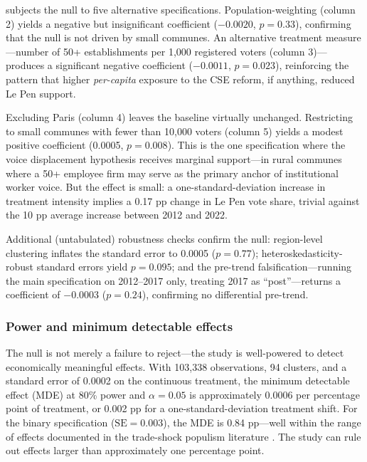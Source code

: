 \documentclass[12pt]{article}
\begin{document}
 subjects the null to five alternative specifications. Population-weighting (column 2) yields a negative but insignificant coefficient ($-0.0020$, $p = 0.33$), confirming that the null is not driven by small communes. An alternative treatment measure---number of 50+ establishments per 1,000 registered voters (column 3)---produces a significant negative coefficient ($-0.0011$, $p = 0.023$), reinforcing the pattern that higher \textit{per-capita} exposure to the CSE reform, if anything, reduced Le Pen support.



Excluding Paris (column 4) leaves the baseline virtually unchanged. Restricting to small communes with fewer than 10,000 voters (column 5) yields a modest positive coefficient (0.0005, $p = 0.008$). This is the one specification where the voice displacement hypothesis receives marginal support---in rural communes where a 50+ employee firm may serve as the primary anchor of institutional worker voice. But the effect is small: a one-standard-deviation increase in treatment intensity implies a 0.17 pp change in Le Pen vote share, trivial against the 10 pp average increase between 2012 and 2022.

Additional (untabulated) robustness checks confirm the null: region-level clustering inflates the standard error to 0.0005 ($p = 0.77$); heteroskedasticity-robust standard errors yield $p = 0.095$; and the pre-trend falsification---running the main specification on 2012--2017 only, treating 2017 as ``post''---returns a coefficient of $-0.0003$ ($p = 0.24$), confirming no differential pre-trend.

\subsubsection*{Power and minimum detectable effects} The null is not merely a failure to reject---the study is well-powered to detect economically meaningful effects. With 103,338 observations, 94 clusters, and a standard error of 0.0002 on the continuous treatment, the minimum detectable effect (MDE) at 80\% power and $\alpha = 0.05$ is approximately 0.0006 per percentage point of treatment, or 0.002 pp for a one-standard-deviation treatment shift. For the binary specification ($\text{SE} = 0.003$), the MDE is 0.84 pp---well within the range of effects documented in the trade-shock populism literature \citep{autor2020, colantone2018}. The study can rule out effects larger than approximately one percentage point.
\end{document}
